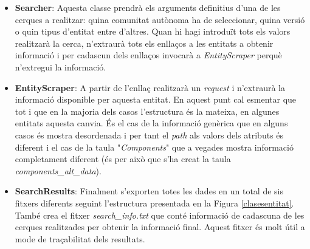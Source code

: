 \documentclass[12pt]{article}
\begin{document}
\begin{itemize}
    \item \textbf{Searcher}: Aquesta classe prendrà els arguments definitius d'una de les cerques a realitzar: quina comunitat autònoma ha de seleccionar, quina versió o quin tipus d'entitat entre d'altres. Quan hi hagi introduït tots els valors realitzarà la cerca, n'extraurà tots els enllaços a les entitats a obtenir informació i per cadascun dels enllaços invocarà a \textit{EntityScraper} perquè n'extregui la informació.
    \item \textbf{EntityScraper}: A partir de l'enllaç realitzarà un \textit{request} i n'extraurà la informació disponible per aquesta entitat. En aquest punt cal esmentar que tot i que en la majoria dels casos l'estructura és la mateixa, en algunes entitats aquesta canvia. És el cas de la informació genèrica que en alguns casos és mostra desordenada i per tant el \textit{path} als valors dels atributs és diferent i el cas de la taula "\textit{Components}" que a vegades mostra informació completament diferent (és per això que s'ha creat la taula \textit{components\_alt\_data}).
    \item \textbf{SearchResults}: Finalment s'exporten totes les dades en un total de sis fitxers diferents seguint l'estructura presentada en la Figura \ref{clasesentitat}. També crea el fitxer \textit{search\_info.txt} que conté informació de cadascuna de les cerques realitzades per obtenir la informació final. Aquest fitxer és molt útil a mode de traçabilitat dels resultats.
\end{itemize}
\end{document}
